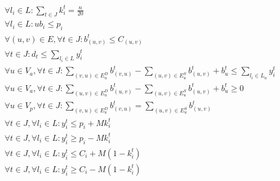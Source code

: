 \begin{algorithm}
\begin{algorithmic}
		\renewcommand{\algorithmicensure}{ \textbf{Subject to:}}
		\ENSURE
     \begin{subequations}
        \begin{align}
            & \forall l_i \in L : \sum_{t \in J} k_{i}^t=\frac{n}{20}  \label{eq:11} \\
            & \forall l_i \in L : ub_i \leq p_i \label{eq:12} \\
            & \forall(u, v)\in E,\forall t \in J : b_{(u, v)}^t \leq C_{(u, v)} \label{eq:13} \\
            & \forall t \in J : d_t \leq \sum_{l_i \in L} y_i^t  \label{eq:14} \\
            & \forall u \in V_a, \forall t \in J  : \sum_{(v, u) \in E_u^D} b_{(v, u)}^t-\sum_{(u, v) \in E_u^S} b_{(u, v)}^t + b_u^t \leq \sum_{l_i \in L_u} y_i^t   \label{eq:15} \\
            & \forall u \in V_a, \forall t \in J  : \sum_{(u, v) \in E_u^D} b_{(u, v)}^t-\sum_{(u, v) \in E_u^S} b_{(u, v)}^t + b_u^t \geq 0   \label{eq:16}  \\
            & \forall u \in V_p,\forall t \in J : \sum_{(v, u) \in E_u^D} b_{(v, u)}^t=\sum_{(u, v) \in E_u^S} b_{(u, v)}^t   \label{eq:17}  \\
            & \forall t \in J, \forall l_i \in L : y_i^t \leq p_i+M k_{i}^t \label{eq:18} \\
            & \forall t \in J, \forall l_i \in L : y_i^t \geq p_i-M k_{i}^t \label{eq:19} \\
            & \forall t \in J, \forall l_i \in L : y_i^t \leq C_i+M\left(1-k_{i}^t\right)  \label{eq:110}  \\
            & \forall t \in J, \forall l_i \in L : y_i^t \geq C_i-M\left(1-k_{i}^t\right) \label{eq:111}
        \end{align}
    \end{subequations}
	\end{algorithmic}
\end{algorithm}



